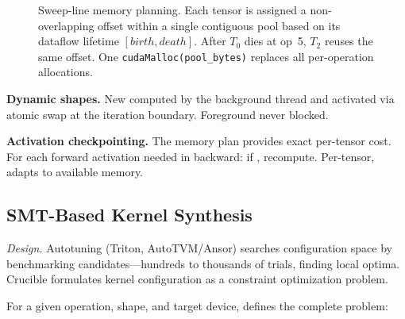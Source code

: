 \begin{figure}[ht]
\caption{Sweep-line memory planning.
  Each tensor is assigned a non-overlapping offset within a single contiguous pool
  based on its dataflow lifetime $[\mathit{birth}, \mathit{death}]$.
  After $T_0$ dies at op~5, $T_2$ reuses the same offset.
  One \texttt{cudaMalloc(pool\_bytes)} replaces all per-operation allocations.}
\label{fig:memplan}
\end{figure}

\textbf{Dynamic shapes.}
New  computed by the background thread and activated via atomic swap at the iteration boundary.
Foreground never blocked.

\textbf{Activation checkpointing.}
The memory plan provides exact per-tensor cost.
For each forward activation needed in backward: if , recompute.
Per-tensor, adapts to available memory.

\subsection{SMT-Based Kernel Synthesis}

\emph{Design.}
Autotuning (Triton, AutoTVM/Ansor) searches configuration space by benchmarking candidates---hundreds to thousands of trials, finding local optima.
Crucible formulates kernel configuration as a constraint optimization problem.

For a given operation, shape, and target device,  defines the complete problem:

